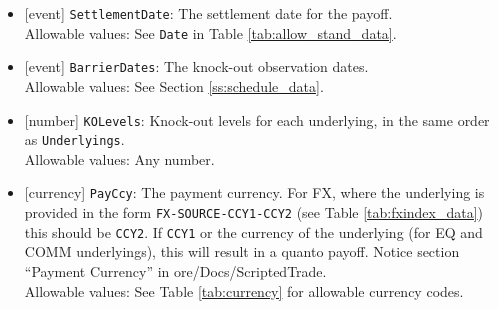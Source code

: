 \begin{itemize}
  Allowable values: See \lstinline!Date! in Table \ref{tab:allow_stand_data}.
  \item{}[event] \lstinline!SettlementDate!: The settlement date for the payoff. \\
  Allowable values: See \lstinline!Date! in Table \ref{tab:allow_stand_data}.
  \item{}[event] \lstinline!BarrierDates!: The knock-out observation dates. \\
  Allowable values: See Section \ref{ss:schedule_data}.
  \item{}[number] \lstinline!KOLevels!: Knock-out levels for each underlying, in the same order as \lstinline!Underlyings!. \\
  Allowable values: Any number.
  \item{}[currency] \lstinline!PayCcy!: The payment currency. For FX, where the underlying is provided
      in the form \lstinline!FX-SOURCE-CCY1-CCY2! (see Table \ref{tab:fxindex_data}) this should
      be \lstinline!CCY2!. If \lstinline!CCY1! or the currency of the underlying (for EQ and
      COMM underlyings), this will result in a quanto payoff. Notice section ``Payment Currency'' in ore/Docs/ScriptedTrade. \\
        Allowable values: See Table \ref{tab:currency} for allowable currency codes.
\end{itemize}
